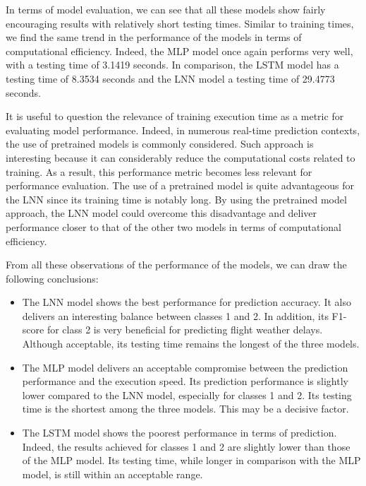 \documentclass[12pt,oneside]{book} %
\begin{document}
\noindent In terms of model evaluation, we can see that all these models show fairly encouraging results with relatively short testing times. Similar to training times, we find the same trend in the performance of the models in terms of computational efficiency. Indeed, the MLP model once again performs very well, with a testing time of 3.1419 seconds. In comparison, the LSTM model has a testing time of 8.3534 seconds and the LNN model a testing time of 29.4773 seconds.

\noindent It is useful to question the relevance of training execution time as a metric for evaluating model performance. Indeed, in numerous real-time prediction contexts, the use of pretrained models is commonly considered. Such approach is interesting because it can considerably reduce the computational costs related to training. As a result, this performance metric becomes less relevant for performance evaluation. The use of a pretrained model is quite advantageous for the LNN since its training time is notably long. By using the pretrained model approach, the LNN model could overcome this disadvantage and deliver performance closer to that of the other two models in terms of computational efficiency.

\noindent From all these observations of the performance of the models, we can draw the following conclusions: 

\begin{itemize}
    \item The LNN model shows the best performance for prediction accuracy. It also delivers an interesting balance between classes 1 and 2. In addition, its F1-score for class 2 is very beneficial for predicting flight weather delays. Although acceptable, its testing time remains the longest of the three models. 
    \item The MLP model delivers an acceptable compromise between the prediction performance and the execution speed. Its prediction performance is slightly lower compared to the LNN model, especially for classes 1 and 2. Its testing time is the shortest among the three models. This may be a decisive factor.
    \item The LSTM model shows the poorest performance in terms of prediction. Indeed, the results achieved for classes 1 and 2 are slightly lower than those of the MLP model. Its testing time, while longer in comparison with the MLP model, is still within an acceptable range.
\end{itemize}
\end{document}
